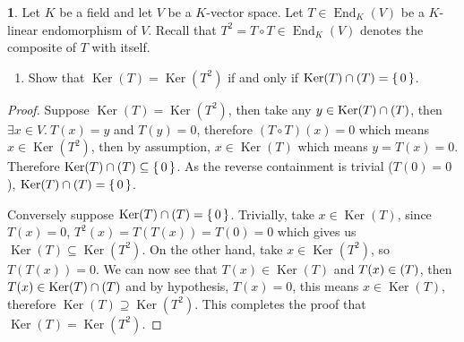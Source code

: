 \documentclass{article}
\theoremstyle{definition}
\newtheorem{problem}{}
\numberwithin{lemma}{problem}
\numberwithin{equation}{problem}
\newcommand{\set}[1]{\left\{\,#1\,\right\}}
\DeclareMathOperator{\End}{End}
\let\Im\relax
\DeclareMathOperator{\Im}{Im}
\DeclareMathOperator{\Ker}{Ker}
\begin{document}
\newpage
\begin{problem}
    Let $K$ be a field and let $V$ be a $K$-vector space.
    Let $T\in \End_K(V)$ be a $K$-linear endomorphism of $V$.
    Recall that $T^2 = T \circ T \in \End_K(V)$ denotes the composite of $T$ with itself.
    \begin{enumerate}[label=(\alph*)]
        \item Show that $\Ker(T) = \Ker(T^2)$ if and only if
            $\Ker(T) \cap \Im(T) = \set{0}$.
    \end{enumerate}
\end{problem}
\begin{proof}
    Suppose $\Ker(T) = \Ker(T^2)$, then
    take any $y\in \Ker(T) \cap \Im(T)$, then
    $\exists x\in V.~ T(x) = y$ and $T(y) = 0$,
    therefore $(T\circ T)(x) = 0$ which means $x\in \Ker(T^2)$,
    then by assumption, $x\in \Ker(T)$ which means $y=T(x) = 0$.
    Therefore $\Ker(T) \cap \Im(T) \subseteq \set{0}$.
    As the reverse containment is trivial ($T(0) = 0$), $\Ker(T) \cap \Im(T) = \set{0}$.

    Conversely suppose $\Ker(T) \cap \Im(T) = \set{0}$.
    Trivially, take $x\in\Ker(T)$, since $T(x) = 0$, $T^2(x) = T(T(x)) = T(0) = 0$ which gives us
    $\Ker(T) \subseteq \Ker(T^2)$.
    On the other hand, take $x\in \Ker(T^2)$, so $T(T(x)) = 0$.
    We can now see that $T(x)\in\Ker(T)$ and $T(x)\in\Im(T)$,
    then $T(x) \in \Ker(T) \cap \Im(T)$ and by hypothesis, $T(x) = 0$,
    this means $x\in\Ker(T)$, therefore $\Ker(T) \supseteq \Ker(T^2)$.
    This completes the proof that $\Ker(T) = \Ker(T^2)$.
\end{proof}
\end{document}
